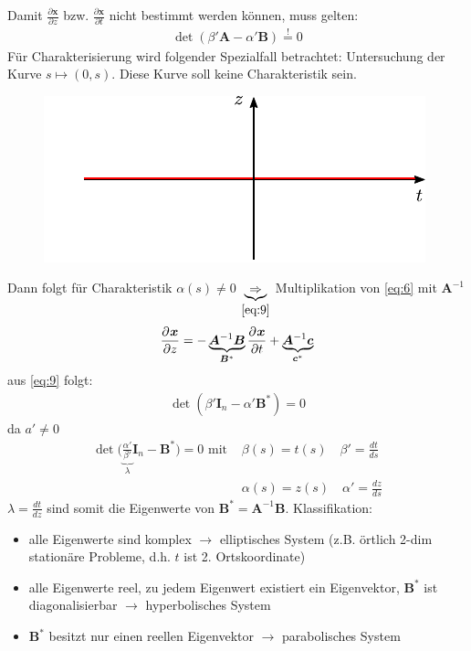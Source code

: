 Damit $\frac{\partial \bm{x}}{\partial z}$ bzw. $\frac{\partial \bm{x}}{\partial t}$ nicht bestimmt werden können, muss gelten:
\begin{align}
\label{eq:9}
\det(\beta'\bm{A}-\alpha'\bm{B}) \overset{!}{=} 0
\end{align}
Für Charakterisierung wird folgender Spezialfall betrachtet:
Untersuchung der Kurve $s \mapsto (0,s)$. Diese Kurve soll keine Charakteristik sein.

\begin{figure}[ht]
	\centering
	\includegraphics{img/keinecharakteristik}
	\label{fig:keinecharakteristik}
\end{figure}

Dann folgt für Charakteristik $\alpha(s) \neq 0$
$\underbrace{\Rightarrow}_{\eqref{eq:9}} $
Multiplikation von \eqref{eq:6} mit $\bm{A}^{-1}$
\begin{align*}
\frac{\partial^{} \bm{x}}{\partial z}=-\underbrace{\bm{A}^{-1}\bm{B}}_{\bm{B}^*} \frac{\partial^{} \bm{x}}{\partial t}+\underbrace{\bm{A}^{-1}\bm{c}}_{\bm{c}^*}
\end{align*}
aus \eqref{eq:9} folgt: 
\begin{align*}
\det(\beta'\bm{I}_n-\alpha'\bm{B}^*)=0
\end{align*}
da $a'\neq0$
\begin{align*}
\det\Big(\underbrace{\frac{\alpha'}{\beta'}}_{\lambda}\bm{I}_n-\bm{B}^*\Big)=0 \textrm{ mit } &\beta(s) = t(s) \quad \beta'=\frac{dt}{ds} \\ &\alpha(s) = z(s) \quad \alpha'=\frac{dz}{ds}
\end{align*}
$\lambda = \frac{dt}{dz}$ sind somit die Eigenwerte von $\bm{B}^*=\bm{A}^{-1}\bm{B}$.
Klassifikation:
\begin{itemize}
\item alle Eigenwerte sind komplex $\rightarrow$ elliptisches System (z.B. örtlich 2-dim stationäre Probleme, d.h. $t$ ist 2. Ortskoordinate)
\item alle Eigenwerte reel, zu jedem Eigenwert existiert ein Eigenvektor, $\bm{B}^*$ ist diagonalisierbar $\rightarrow$ hyperbolisches System
\item $\bm{B}^*$  besitzt nur einen reellen Eigenvektor $\rightarrow$ parabolisches System
\end{itemize}

